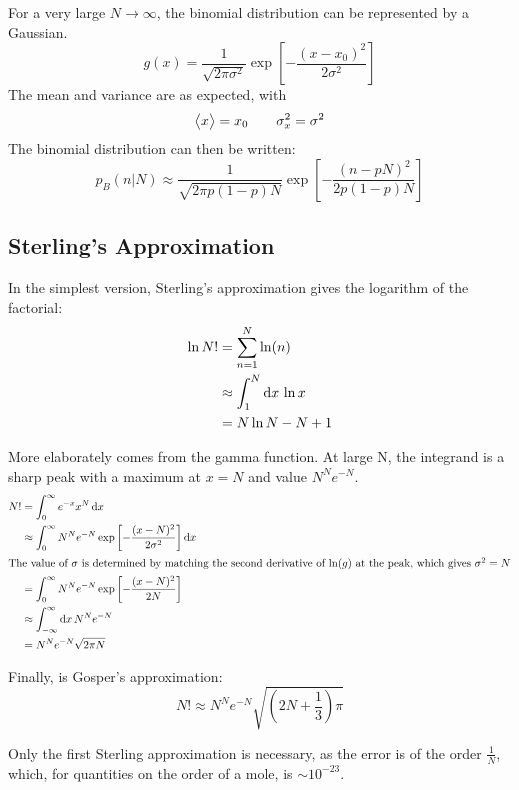 For a very large \(N\to\infty\), the binomial distribution can be represented by a Gaussian.
\begin{equation}
	g(x)=\frac{1}{\sqrt{2\pi\sigma^2}}\exp\left[-\frac{(x-x_0)^2}{2\sigma^2}\right]\label{eq2:gaussian}
\end{equation}
The mean and variance are as expected, with
\[\left\langle \begin{matrix}x\end{matrix} \right\rangle=x_0\qquad \sigma_x^2=\sigma^2\]
The binomial distribution can then be written:
\begin{equation}
	p_B(n|N)\approx\frac{1}{\sqrt{2\pi p(1-p)N}}\exp\left[-\frac{(n-pN)^2}{2p(1-p)N}\right]\label{eq2:binomgauss}
\end{equation}

\subsection{Sterling's Approximation}
In the simplest version, Sterling's approximation gives the logarithm of the factorial:
\begin{align}
	\ln N! &= \sum_{n=1}^N\ln(n)\nonumber\\
	       &\approx \int_1^N\d{x} \ln x\nonumber\\
	       &=N\ln N - N + 1 \label{eq2:sterling1}
\end{align}

More elaborately comes from the gamma function. At large N, the integrand is a sharp peak with a maximum at \(x=N\) and value \(N^N e^{-N}\).
\begin{align}
	N!&=\int_0^\infty e^{-x}x^N\d{x}\label{eq2:gamma}\\
	  &\approx\int_0^\infty N^N e^{-N} \exp\left[-\frac{(x-N)^2}{2\sigma^2}\right]\d{x}\nonumber\\
	  \intertext{The value of \(\sigma\) is determined by matching the second derivative of \(\ln(g)\) at the peak, which gives \(\sigma^2=N\)}
	  &=\int_0^\infty N^N e^{-N}\exp\left[-\frac{(x-N)^2}{2N}\right]\nonumber\\
	  &\approx \int_{-\infty}^\infty\d{x}N^N e^{-N}\nonumber\\
	  &=N^N e^{-N}\sqrt{2\pi N} \label{eq2:sterling2}
\end{align}

Finally, is Gosper's approximation:
\begin{equation}
	N!\approx N^Ne^{-N} \sqrt{\left(2N+\frac{1}{3}\right)\pi}\label{eq2:gosper}
\end{equation}

Only the first Sterling approximation is necessary, as the error is of the order \(\frac{1}{N}\), which, for quantities on the order of a mole, is \(\sim 10^{-23}\).

